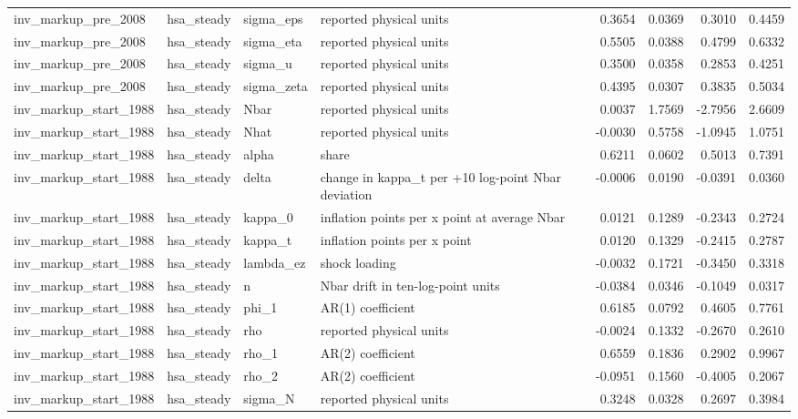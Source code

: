 \begin{tabular}{llllrrrr}
inv\_markup\_pre\_2008 & hsa\_steady & sigma\_eps & reported physical units & 0.3654 & 0.0369 & 0.3010 & 0.4459 \\
inv\_markup\_pre\_2008 & hsa\_steady & sigma\_eta & reported physical units & 0.5505 & 0.0388 & 0.4799 & 0.6332 \\
inv\_markup\_pre\_2008 & hsa\_steady & sigma\_u & reported physical units & 0.3500 & 0.0358 & 0.2853 & 0.4251 \\
inv\_markup\_pre\_2008 & hsa\_steady & sigma\_zeta & reported physical units & 0.4395 & 0.0307 & 0.3835 & 0.5034 \\
inv\_markup\_start\_1988 & hsa\_steady & Nbar & reported physical units & 0.0037 & 1.7569 & -2.7956 & 2.6609 \\
inv\_markup\_start\_1988 & hsa\_steady & Nhat & reported physical units & -0.0030 & 0.5758 & -1.0945 & 1.0751 \\
inv\_markup\_start\_1988 & hsa\_steady & alpha & share & 0.6211 & 0.0602 & 0.5013 & 0.7391 \\
inv\_markup\_start\_1988 & hsa\_steady & delta & change in kappa\_t per +10 log-point Nbar deviation & -0.0006 & 0.0190 & -0.0391 & 0.0360 \\
inv\_markup\_start\_1988 & hsa\_steady & kappa\_0 & inflation points per x point at average Nbar & 0.0121 & 0.1289 & -0.2343 & 0.2724 \\
inv\_markup\_start\_1988 & hsa\_steady & kappa\_t & inflation points per x point & 0.0120 & 0.1329 & -0.2415 & 0.2787 \\
inv\_markup\_start\_1988 & hsa\_steady & lambda\_ez & shock loading & -0.0032 & 0.1721 & -0.3450 & 0.3318 \\
inv\_markup\_start\_1988 & hsa\_steady & n & Nbar drift in ten-log-point units & -0.0384 & 0.0346 & -0.1049 & 0.0317 \\
inv\_markup\_start\_1988 & hsa\_steady & phi\_1 & AR(1) coefficient & 0.6185 & 0.0792 & 0.4605 & 0.7761 \\
inv\_markup\_start\_1988 & hsa\_steady & rho & reported physical units & -0.0024 & 0.1332 & -0.2670 & 0.2610 \\
inv\_markup\_start\_1988 & hsa\_steady & rho\_1 & AR(2) coefficient & 0.6559 & 0.1836 & 0.2902 & 0.9967 \\
inv\_markup\_start\_1988 & hsa\_steady & rho\_2 & AR(2) coefficient & -0.0951 & 0.1560 & -0.4005 & 0.2067 \\
inv\_markup\_start\_1988 & hsa\_steady & sigma\_N & reported physical units & 0.3248 & 0.0328 & 0.2697 & 0.3984 \\

\end{tabular}
